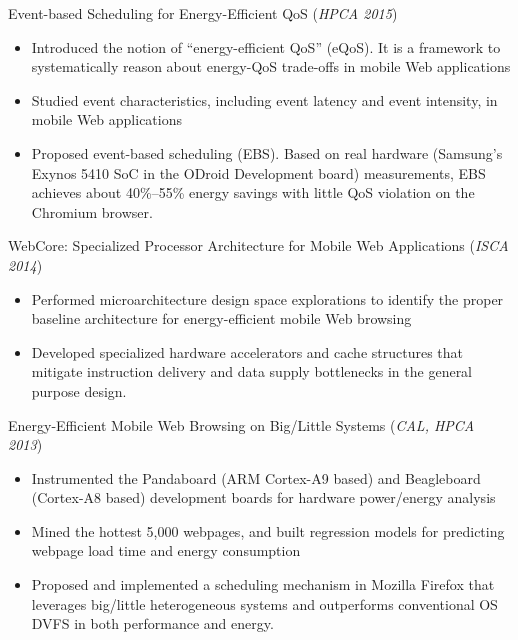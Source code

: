 \documentclass[margin, 9pt]{res} %
\begin{document}
\begin{resume}
\medskip
Event-based Scheduling for Energy-Efficient QoS \hfill(\textit{HPCA 2015})\\
\vspace*{-10pt}
\begin{itemize}[leftmargin=*] \itemsep -3pt
\vspace*{-5pt}
	\item Introduced the notion of ``energy-efficient QoS'' (eQoS). It is a framework to systematically reason about energy-QoS trade-offs in mobile Web applications
	\item Studied event characteristics, including event latency and event intensity, in mobile Web applications
	\item Proposed event-based scheduling (EBS). Based on real hardware (Samsung's Exynos 5410 SoC in the ODroid Development board) measurements, EBS achieves about 40\%--55\% energy savings with little QoS violation on the Chromium browser.
\end{itemize}

\medskip
WebCore: Specialized Processor Architecture for Mobile Web Applications \hfill(\textit{ISCA 2014})\\
\vspace*{-10pt}
\begin{itemize}[leftmargin=*] \itemsep -3pt
\vspace*{-5pt}
	\item Performed microarchitecture design space explorations to identify the proper baseline architecture for energy-efficient mobile Web browsing
	\item Developed specialized hardware accelerators and cache structures that mitigate instruction delivery and data supply bottlenecks in the general purpose design.
\end{itemize}

\medskip
Energy-Efficient Mobile Web Browsing on Big/Little Systems \hfill(\textit{CAL, HPCA 2013})\\
\vspace*{-10pt}
\begin{itemize}[leftmargin=*] \itemsep -3pt
\vspace*{-5pt}
	\item Instrumented the Pandaboard (ARM Cortex-A9 based) and Beagleboard (Cortex-A8 based) development boards for hardware power/energy analysis
	\item Mined the hottest 5,000 webpages, and built regression models for predicting webpage load time and energy consumption
	\item Proposed and implemented a scheduling mechanism in Mozilla Firefox that leverages big/little heterogeneous systems and outperforms conventional OS DVFS in both performance and energy.
\end{itemize}


\end{resume}
\end{document}
